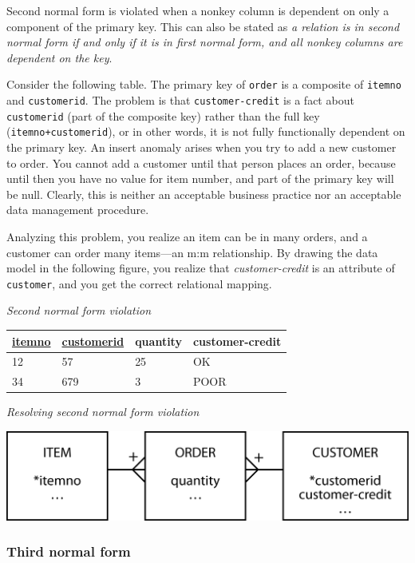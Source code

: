 \documentclass[
]{article}
\begin{document}
Second normal form is violated when a nonkey column is dependent on only
a component of the primary key. This can also be stated as \emph{a relation
is in second normal form if and only if it is in first normal form, and
all nonkey columns are dependent on the key}.

Consider the following table. The primary key of \texttt{order} is a composite
of \texttt{itemno} and \texttt{customerid}. The problem is that \texttt{customer-credit} is a
fact about \texttt{customerid} (part of the composite key) rather than the full
key (\texttt{itemno+customerid}), or in other words, it is not fully
functionally dependent on the primary key. An insert anomaly arises when
you try to add a new customer to order. You cannot add a customer until
that person places an order, because until then you have no value for
item number, and part of the primary key will be null. Clearly, this is
neither an acceptable business practice nor an acceptable data
management procedure.

Analyzing this problem, you realize an item can be in many orders, and a
customer can order many items---an m:m relationship. By drawing the data
model in the following figure, you realize that \emph{customer-credit} is an
attribute of \texttt{customer}, and you get the correct relational mapping.

\emph{Second normal form violation}

\begin{longtable}[]{@{}llll@{}}
\toprule
\underline{itemno} & \underline{customerid} & quantity & customer-credit \\
\midrule
\endhead
12 & 57 & 25 & OK \\
34 & 679 & 3 & POOR \\
\bottomrule
\end{longtable}

\emph{Resolving second normal form violation}

\includegraphics[width=6.26042in,height=\textheight]{Figures/Chapter 8/2NF.png}

\hypertarget{third-normal-form}{%
\subsubsection*{Third normal form}\label{third-normal-form}}
\end{document}
